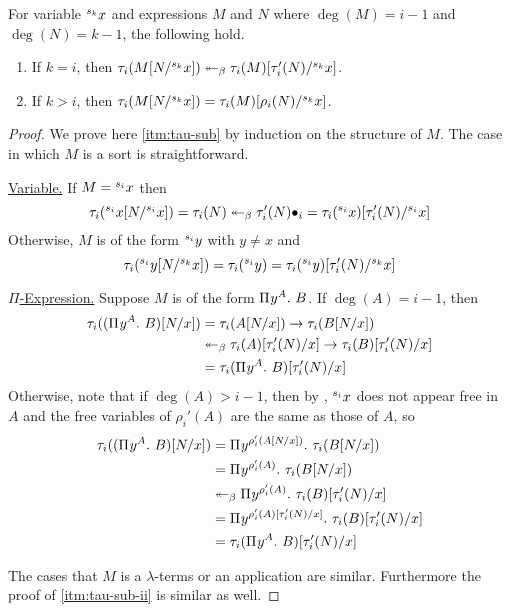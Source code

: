 \documentclass{article}
\begin{document}
\begin{lemma}\label{lem:tau-sub}
For variable ${}^{s_{k}}{x}$ and expressions $M$ and $N$ where $\deg(M) = i - 1$ and $\deg(N) = k - 1$, the following hold.
\begin{enumerate}
    \item\label{itm:tau-sub} If $k = i$, then $\tau_i(M[N/{}^{s_{k}}{x}]) \twoheadleftarrow_\beta \tau_i(M)[\tau_i'(N)/{}^{s_{k}}{x}]$.
    \item\label{itm:tau-sub-ii} If $k > i$, then $\tau_i(M[N/{}^{s_{k}}{x}]) = \tau_i(M)[\rho_i(N)/{}^{s_{k}}{x}]$.
\end{enumerate}
\end{lemma}

\begin{proof}
We prove here \autoref{itm:tau-sub} by induction on the structure of $M$.
The case in which $M$ is a sort is straightforward.

\noindent\underline{Variable.} If $M = {}^{s_{i}}{x}$ then
\[
    \tau_i({}^{s_{i}}{x}[N/{}^{s_{i}}{x}]) =
    \tau_i(N) \twoheadleftarrow_\beta
    \tau_i'(N)\bullet_i =
    \tau_i({}^{s_{i}}{x})[\tau_i'(N)/{}^{s_{i}}{x}]
\]
Otherwise, $M$ is of the form ${}^{s_{i}}{y}$ with $y \not = x$ and
\[
    \tau_i({}^{s_{i}}{y}[N/{}^{s_{k}}{x}]) =
    \tau_i({}^{s_{i}}{y}) =
    \tau_i({}^{s_{i}}{y})[\tau_i'(N)/{}^{s_{k}}{x}]
\]

\noindent\underline{$\Pi$-Expression.} Suppose $M$ is of the form ${\Pi^{} {y}^{A}. \ {B}}$.
If $\deg(A) = i - 1$, then
\begin{align*}
\tau_i(({\Pi^{} {y}^{A}. \ {B}})[N/x]) &=
\tau_i(A[N/x]) \to \tau_i(B[N/x]) \\ &\twoheadleftarrow_\beta
\tau_i(A)[\tau_i'(N)/x] \to \tau_i(B)[\tau_i'(N)/x] \\ &=
\tau_i({\Pi^{} {y}^{A}. \ {B}})[\tau_i'(N)/x]
\end{align*}
Otherwise, note that if $\deg(A) > i - 1$, then by , ${}^{s_{i}}{x}$ does not appear free in $A$ and the free variables of $\rho_i'(A)$ are the same as those of $A$, so
\begin{align*}
\tau_i(({\Pi^{} {y}^{A}. \ {B}})[N/x]) &=
{\Pi^{} {y}^{\rho_i'(A[N/x])}. \ {\tau_i(B[N/x])}} \\ &= 
{\Pi^{} {y}^{\rho_i'(A)}. \ {\tau_i(B[N/x])}} \\ &\twoheadleftarrow_\beta
{\Pi^{} {y}^{\rho_i'(A)}. \ {\tau_i(B)[\tau_i'(N)/x]}} \\ &=
{\Pi^{} {y}^{\rho_i'(A)[\tau_i'(N)/x]}. \ {\tau_i(B)[\tau_i'(N)/x]}} \\ &=
\tau_i({\Pi^{} {y}^{A}. \ {B}})[\tau_i'(N)/x]
\end{align*}

The cases that $M$ is a $\lambda$-terms or an application are similar.
Furthermore the proof of \autoref{itm:tau-sub-ii} is similar as well.
\end{proof}
\end{document}

